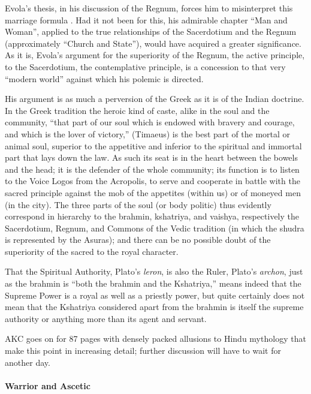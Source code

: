 \begin{quotationx}
Evola's thesis, in his discussion of the Regnum, forces him to misinterpret this marriage formula . Had it not been for this, his admirable chapter ``Man and Woman'', applied to the true relationships of the Sacerdotium and the Regnum (approximately ``Church and State''), would have acquired a greater significance. As it is, Evola's argument for the superiority of the Regnum, the active principle, to the Sacerdotium, the contemplative principle, is a concession to that very ``modern world'' against which his polemic is directed.

His argument is as much a perversion of the Greek as it is of the Indian doctrine. In the Greek tradition the heroic kind of caste, alike in the soul and the community, ``that part of our soul which is endowed with bravery and courage, and which is the lover of victory,'' (Timaeus) is the best part of the mortal or animal soul, superior to the appetitive and inferior to the spiritual and immortal part that lays down the law. As such its seat is in the heart between the bowels and the head; it is the defender of the whole community; its function is to listen to the Voice Logos from the Acropolis, to serve and cooperate in battle with the sacred principle against the mob of the appetites (within us) or of moneyed men (in the city). The three parts of the soul (or body politic) thus evidently correspond in hierarchy to the brahmin, kshatriya, and vaishya, respectively the Sacerdotium, Regnum, and Commons of the Vedic tradition (in which the shudra is represented by the Asuras); and there can be no possible doubt of the superiority of the sacred to the royal character.

That the Spiritual Authority, Plato's \emph{leron}, is also the Ruler, Plato's \emph{archon}, just as the brahmin is ``both the brahmin and the Kshatriya,'' means indeed that the Supreme Power is a royal as well as a priestly power, but quite certainly does not mean that the Kshatriya considered apart from the brahmin is itself the supreme authority or anything more than its agent and servant.
\end{quotationx}


AKC goes on for 87 pages with densely packed allusions to Hindu mythology that make this point in increasing detail; further discussion will have to wait for another day.

\paragraph{Warrior and Ascetic}


